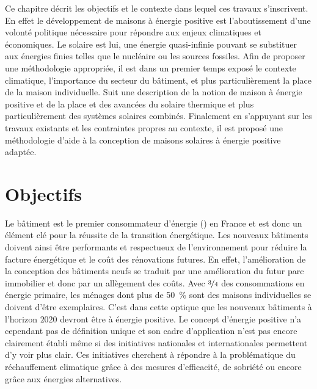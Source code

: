


Ce chapitre décrit les objectifs et le contexte dans lequel ces travaux s’inscrivent. En
effet le développement de maisons à énergie positive est l’aboutissement d’une volonté
politique nécessaire pour répondre aux enjeux climatiques et économiques. Le solaire est
lui, une énergie quasi-infinie pouvant se substituer aux énergies finies telles que le
nucléaire ou les sources fossiles. Afin de proposer une méthodologie appropriée, il est
dans un premier temps exposé le contexte climatique, l’importance du secteur du bâtiment,
et plus particulièrement la place de la maison individuelle. Suit une description de la
notion de maison à énergie positive et de la place et des avancées du solaire thermique et
plus particulièrement des systèmes solaires combinés. Finalement en s’appuyant sur les
travaux existants et les contraintes propres au contexte, il est proposé une méthodologie
d’aide à la conception de maisons solaires à énergie positive adaptée.
\clearpage



\section{Objectifs} %
\label{sec:objectifs}
Le bâtiment est le premier consommateur d’énergie () en France et est
donc un élément clé pour la réussite de la transition énergétique. Les nouveaux bâtiments
doivent ainsi être performants et respectueux de l’environnement pour réduire la facture
énergétique et le coût des rénovations futures. En effet, l’amélioration de la conception
des bâtiments neufs se traduit par une amélioration du futur parc immobilier et donc par
un allègement des coûts. Avec $\nicefrac{3}{4}$ des consommations en énergie primaire, les
ménages dont plus de \SI{50}{\percent} sont des maisons individuelles se doivent d’être
exemplaires. C’est dans cette optique que les nouveaux bâtiments à l’horizon $2020$
devront être à énergie positive. Le concept d’énergie positive n’a cependant pas de
définition unique et son cadre d’application n’est pas encore clairement établi même si
des initiatives nationales et internationales permettent d’y voir plus clair. Ces
initiatives cherchent à répondre à la problématique du réchauffement climatique grâce à
des mesures d’efficacité, de sobriété ou encore grâce aux énergies alternatives.

